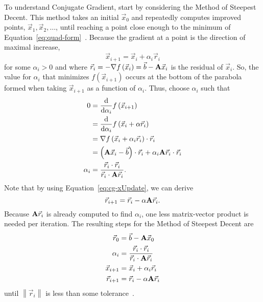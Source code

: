 To understand Conjugate Gradient, start by considering the Method of Steepest Decent.
This method takes an initial \(\vec{x}_0\) and repeatedly computes improved points, \(\vec{x}_1, \vec{x}_2, \dots\), until reaching a point close enough to the minimum of Equation~\ref{eq:quad-form}~\cite{Nearing:2010:toolsForPhysics}.
Because the gradient at a point is the direction of maximal increase, 
\begin{equation}
\label{eq:cg-xUpdate}
	\vec{x}_{i+1} = \vec{x}_i + \alpha_i \vec{r}_i
\end{equation}
for some \(\alpha_i > 0\) and where \(\vec{r}_i = -\nabla f\left(\vec{x}_i\right) = \vec{b} - \mathbf{A}\vec{x}_i\) is the residual of \(\vec{x}_i\).
So, the value for \(\alpha_i\) that minimizes \(f\left(\vec{x}_{i+1}\right)\) occurs at the bottom of the parabola formed when taking \(\vec{x}_{i+1}\) as a function of \(\alpha_i\).
Thus, choose \(\alpha_i\) such that
\begin{align*}
	0
	&= \frac{\mathrm{d}}{\mathrm{d} \alpha_i} f\left(\vec{x}_{i+1}\right) \\
	&= \frac{\mathrm{d}}{\mathrm{d} \alpha_i} f\left(\vec{x}_i + \alpha \vec{r}_i\right) \\
	&= \nabla f\left(\vec{x}_i+\alpha_i\vec{r}_i\right) \cdot \vec{r}_i \\
	&= \left(\mat{A}\vec{x}_i-\vec{b}\right)\cdot \vec{r}_i + \alpha_i\mat{A}\vec{r}_i\cdot \vec{r}_i\\
%
	\alpha_i
	&= \frac{\vec{r}_i\cdot \vec{r}_i}{\vec{r}_i\cdot\mat{A}\vec{r}_i}.
\end{align*}
Note that by using Equation~\ref{eq:cg-xUpdate}, we can derive
\[
	\vec{r}_{i+1} = \vec{r}_i - \alpha\mathbf{A}\vec{r}_i.
\]
Because \(\mathbf{A}\vec{r}_i\) is already computed to find \(\alpha_i\), one less matrix-vector product is needed per iteration.
The resulting steps for the Method of Steepest Decent are
\begin{align*}
	\vec{r}_0 &= \vec{b} - \mathbf{A}\vec{x}_0 \\
	\alpha_i &= \frac{\vec{r}_i\cdot \vec{r}_i}{\vec{r}_i\cdot\mathbf{A}\vec{r}_i}\\
	\vec{x}_{i+1} &= \vec{x}_i + \alpha_i\vec{r}_i\\
	\vec{r}_{i+1} &= \vec{r}_i - \alpha\mathbf{A}\vec{r}_i
\end{align*}
until \(\left\|\vec{r}_i\right\|\) is less than some tolerance~\cite{Shewchuk:1994:IntroToCG}.


